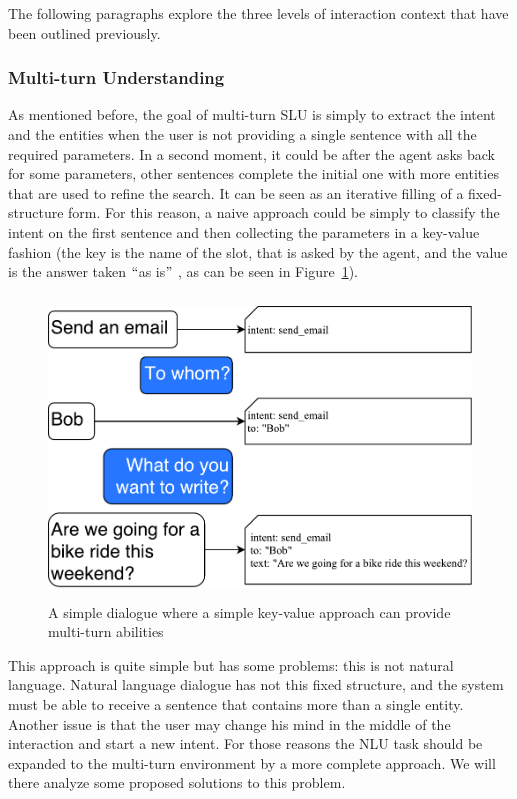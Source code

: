 The following paragraphs explore the three levels of interaction context that have been outlined previously.

\subsubsection{Multi-turn Understanding}
As mentioned before, the goal of multi-turn SLU is simply to extract the intent and the entities when the user is not providing a single sentence with all the required parameters. In a second moment, it could be after the agent asks back for some parameters, other sentences complete the initial one with more entities that are used to refine the search. It can be seen as an iterative filling of a fixed-structure form. For this reason, a naive approach could be simply to classify the intent on the first sentence and then collecting the parameters in a key-value fashion (the key is the name of the slot, that is asked by the agent, and the value is the answer taken $``$as is$"$ , as can be seen in Figure~\ref{fig:multiTurnFilling}).

\begin{figure}[!htb]
    \centering
    \includegraphics[max width=0.9\linewidth,max height=8cm,keepaspectratio]{figures/multiTurnFilling}
    \caption{A simple dialogue where a simple key-value approach can provide multi-turn abilities}\label{fig:multiTurnFilling}
\end{figure}

This approach is quite simple but has some problems: this is not natural language. Natural language dialogue has not this fixed structure, and the system must be able to receive a sentence that contains more than a single entity. Another issue is that the user may change his mind in the middle of the interaction and start a new intent. For those reasons the NLU task should be expanded to the multi-turn environment by a more complete approach. We will there analyze some proposed solutions to this problem.

